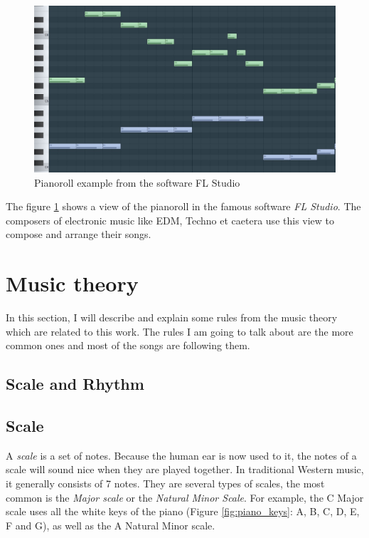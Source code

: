 \documentclass[12pt]{report}
\begin{document}
\begin{figure}[H]
    \centering
    \includegraphics[width=0.75 \textwidth]{images/music/pianoroll/pianoroll_flstudio.jpg}
    \caption{Pianoroll example from the software FL Studio}
    \label{fig:pianoroll_flstudio}
\end{figure}

The figure \ref{fig:pianoroll_flstudio} shows a view of the pianoroll in the famous software \textit{FL Studio}. The composers of electronic music like EDM, Techno et caetera use this view to compose and arrange their songs.


\section{Music theory}

In this section, I will describe and explain some rules from the music theory which are related to this work. The rules I am going to talk about are the more common ones and most of the songs are following them.

\subsection{Scale and Rhythm}

\subsection*{Scale}

A \textit{scale} is a set of notes. Because the human ear is now used to it, the notes of a scale will sound nice when they are played together. In traditional Western music, it generally consists of 7 notes. They are several types of scales, the most common is the \textit{Major scale} or the \textit{Natural Minor Scale}. For example, the C Major scale uses all the white keys of the piano (Figure \ref{fig:piano_keys}: A, B, C, D, E, F and G), as well as the A Natural Minor scale.
\end{document}
